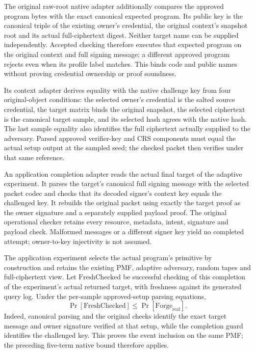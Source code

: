 The original raw-root native adapter additionally compares the approved program
bytes with the exact canonical expected program. Its public key is the
canonical triple of the existing owner's credential, the original context's
snapshot root and its actual full-ciphertext digest. Neither target name can
be supplied independently. Accepted checking therefore executes that expected
program on the original context and full signing message; a different
approved program rejects even when its profile label matches. This binds
code and public names without proving credential ownership or proof soundness.

Its context adapter derives equality with the native challenge key from four
original-object conditions: the selected owner's credential is the salted source
credential, the target matrix binds the original snapshot, the selected
ciphertext is the canonical target sample, and its selected hash agrees with
the native hash. The last sample equality also identifies the full ciphertext
actually supplied to the adversary. Parsed approved verifier-key and CRS
components must equal the actual setup output at the sampled seed; the
checked packet then verifies under that same reference.

An application completion adapter reads the actual final target of the
adaptive experiment. It parses the target's canonical full signing message
with the selected packet codec and checks that its decoded signer's context
key equals the challenged key. It rebuilds the original packet using exactly
the target proof as the owner signature and a separately supplied payload
proof. The original operational checker retains every resource, metadata,
intent, signature and payload check. Malformed messages or a different
signer key yield no completed attempt; owner-to-key injectivity is not assumed.

The application experiment selects the actual program's primitive by
construction and retains the existing PMF, adaptive adversary, random tapes
and full-ciphertext view. Let \(\mathrm{FreshChecked}\) be successful checking
of this completion of the experiment's actual returned target, with freshness
against its generated query log. Under the per-sample approved-setup parsing
equations,
\[
 \Pr[\mathrm{FreshChecked}]
 \le \Pr[\mathrm{Forge}_{\mathrm{real}}].
\]
Indeed, canonical parsing and the original checks identify the exact target
message and owner signature verified at that setup, while the completion
guard identifies the challenged key. This proves the event inclusion on the
same PMF; the preceding five-term native bound therefore applies.

